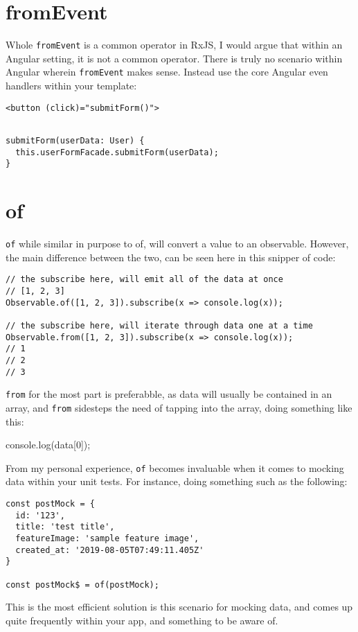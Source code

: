 \section{fromEvent}
Whole \lstinline{fromEvent} is a common operator in RxJS, I would argue that within 
an Angular setting, it is not a common operator. There is truly no scenario within 
Angular wherein \lstinline{fromEvent} makes sense. Instead use the core Angular 
even handlers within your template: 

\begin{lstlisting}[caption=user-form.input.ts]
<button (click)="submitForm()">
\end{lstlisting}

\begin{lstlisting}[caption=user-form.component.ts]

submitForm(userData: User) {
  this.userFormFacade.submitForm(userData);
}
\end{lstlisting}

\section{of}
\lstinline{of} while similar in purpose to of, will convert a value to an 
observable. However, the main difference between the two, can be seen here
in this snipper of code:
\begin{lstlisting}
// the subscribe here, will emit all of the data at once  
// [1, 2, 3]
Observable.of([1, 2, 3]).subscribe(x => console.log(x));  

// the subscribe here, will iterate through data one at a time
Observable.from([1, 2, 3]).subscribe(x => console.log(x));  
// 1
// 2
// 3
\end{lstlisting} 

\lstinline{from} for the most part is preferabble, as data will usually 
be contained in an array, and \lstinline{from} sidesteps the need of 
tapping into the array, doing something like this:
\begin{verbatin}
console.log(data[0]);
\end{verbatin}

From my personal experience, \lstinline{of} becomes invaluable when it comes 
to mocking data within your unit tests. For instance, doing something such as
the following: 
\begin{lstlisting}
const postMock = {
  id: '123',
  title: 'test title',
  featureImage: 'sample feature image',
  created_at: '2019-08-05T07:49:11.405Z' 
}

const postMock$ = of(postMock);
\end{lstlisting}

This is the most efficient solution is this scenario for mocking data, and 
comes up quite frequently within your app, and something to be aware of. 

